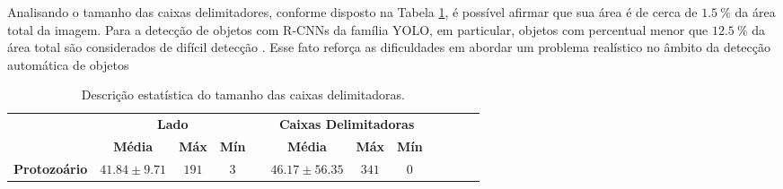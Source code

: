 Analisando o tamanho das caixas delimitadores, conforme disposto na Tabela \ref{tab:bounding-boxes}, é possível afirmar que sua área é de cerca de $\SI{1.5}{\percent}$ da área total da imagem. Para a detecção de objetos com R-CNNs da família YOLO, em particular, objetos com percentual menor que $\SI{12.5}{\percent}$ da área total são considerados de difícil detecção \cite{Xiao:2021}. Esse fato reforça as dificuldades em abordar um problema realístico no âmbito da detecção automática de objetos

\begin{table}[h!]
\begin{center}
\caption{Descrição estatística do tamanho das caixas delimitadoras.} 
\begin{footnotesize}
\begin{tabular}{cccccccccccc}
\toprule
        & \multicolumn{3}{c}{\textbf{Lado}} & & \multicolumn{3}{c}{\textbf{Caixas Delimitadoras}} \\
        \cmidrule{2-4} \cmidrule{6-8}
      &  \textbf{Média} & \textbf{Máx} & \textbf{Mín} & &     \textbf{Média} & \textbf{Máx} & \textbf{Mín}\\
\midrule
\label{tab:bounding-boxes}
\textbf{Protozoário} & $41.84 \pm 9.71$ & $191$ & $3$ & & $46.17 \pm 56.35$ & $341$ & $0$\\
\bottomrule
\end{tabular}
\end{footnotesize}
\end{center}
\end{table}